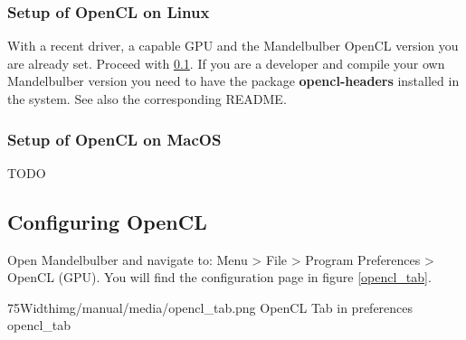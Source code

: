 \subsubsection{Setup of OpenCL on Linux}\label{setup-opencl-linux}
With a recent driver, a capable GPU and the Mandelbulber OpenCL version you are already set.
Proceed with \ref{configure-opencl}. 
If you are a developer and compile your own Mandelbulber version
you need to have the package \textbf{opencl-headers} installed in the system.  
See also the corresponding README.

\subsubsection{Setup of OpenCL on MacOS}\label{setup-opencl-macos}
TODO

\subsection{Configuring OpenCL}\label{configure-opencl}
Open Mandelbulber and navigate to: Menu > File > Program Preferences > OpenCL (GPU).
You will find the configuration page in figure \ref{opencl_tab}.

\simpleImageWithCaption75Width{img/manual/media/opencl_tab.png}
{OpenCL Tab in preferences}
{opencl_tab}

